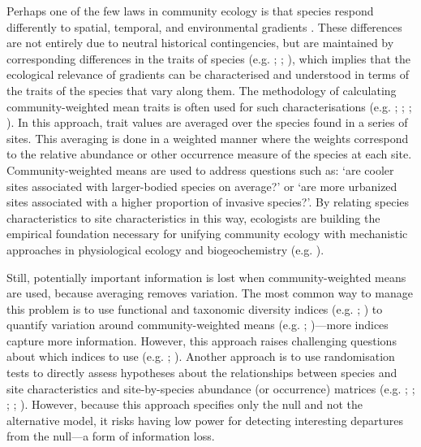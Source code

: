 \documentclass[12pt]{ecology}
\begin{document}
Perhaps one of the few laws in community ecology is that species respond differently to spatial, temporal, and environmental gradients \citep{Gleason1917,Whittaker1967}.  These differences are not entirely due to neutral historical contingencies, but are maintained by corresponding differences in the traits of species (e.g. ; ; ), which implies that the ecological relevance of gradients can be characterised and understood in terms of the traits of the species that vary along them.  The methodology of calculating community-weighted mean traits is often used for such characterisations (e.g. ; ; ; ).  In this approach, trait values are averaged over the species found in a series of sites.  This averaging is done in a weighted manner where the weights correspond to the relative abundance or other occurrence measure of the species at each site.  Community-weighted means are used to address questions such as:  `are cooler sites associated with larger-bodied species on average?' or `are more urbanized sites associated with a higher proportion of invasive species?'.  By relating species characteristics to site characteristics in this way, ecologists are building the empirical foundation necessary for unifying community ecology with mechanistic approaches in physiological ecology and biogeochemistry (e.g. ).

Still, potentially important information is lost when community-weighted means are used, because averaging removes variation.  The most common way to manage this problem is to use functional and taxonomic diversity indices (e.g. ; ) to quantify variation around community-weighted means (e.g. ; )---more indices capture more information.  However, this approach raises challenging questions about which indices to use (e.g. ; ).  Another approach is to use randomisation tests to directly assess hypotheses about the relationships between species and site characteristics and site-by-species abundance (or occurrence) matrices (e.g. ; ; ; ; ).  However, because this approach specifies only the null and not the alternative model, it risks having low power for detecting interesting departures from the null---a form of information loss.
\end{document}
